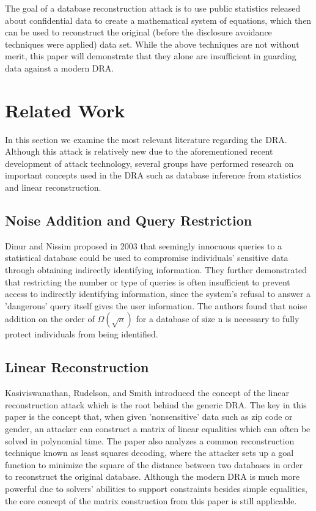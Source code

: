 \documentclass[5p,times,11pt]{elsarticle}
\begin{document}
The goal of a database reconstruction attack is to
use public statistics released about confidential data to create a mathematical system of equations,
which then can be used to reconstruct the original (before the disclosure
avoidance techniques were applied) data set.
While the above techniques are not without merit, this paper will
demonstrate that they alone are insufficient in guarding data against
a modern DRA.

\section{Related Work}


In this section we examine the most relevant literature regarding the DRA. Although this attack is relatively new due to the aforementioned recent development of attack technology, several groups have performed research on important concepts used in the DRA such as database inference from statistics and linear reconstruction.

\subsection{Noise Addition and Query Restriction}
Dinur and Nissim \cite{noise} proposed in 2003 that seemingly innocuous queries to a statistical database could be used to compromise individuals' sensitive data through obtaining indirectly identifying information. They further demonstrated that restricting the number or type of queries is often insufficient to prevent access to indirectly identifying information, since the system's refusal to answer a 'dangerous' query itself gives the user information. The authors found that noise addition on the order of $\Omega(\sqrt{n})$ for a database of size n is necessary to fully protect individuals from being identified.


\subsection{Linear Reconstruction}

Kasiviswanathan, Rudelson, and Smith \cite{linearattack} introduced the concept of the linear reconstruction attack which is the root behind the generic DRA. The key in this paper is the concept that, when given 'nonsensitive' data such as zip code or gender, an attacker can construct a matrix of linear equalities which can often be solved in polynomial time. The paper also analyzes a common reconstruction technique known as least squares decoding, where the attacker sets up a goal function to minimize the square of the distance between two databases in order to reconstruct the original database. Although the modern DRA is much more powerful due to solvers' abilities to support constraints besides simple equalities, the core concept of the matrix construction from this paper is still applicable.
\end{document}
